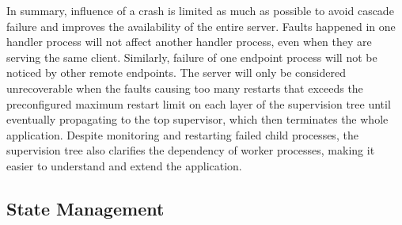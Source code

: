 

In summary, influence of a crash is limited as much as possible to avoid cascade failure and improves the availability of the entire server. Faults happened in one handler process will not affect another handler process, even when they are serving the same client. Similarly, failure of one endpoint process will not be noticed by other remote endpoints. The server will only be considered unrecoverable when the faults causing too many restarts that exceeds the preconfigured maximum restart limit on each layer of the supervision tree until eventually propagating to the top supervisor, which then terminates the whole application. Despite monitoring and restarting failed child processes, the supervision tree also clarifies the dependency of worker processes, making it easier to understand and extend the application.

\subsection{State Management}\label{state_management}


